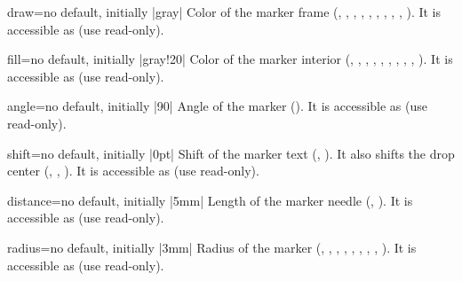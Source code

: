 \begin{docMrcKey}[marker]{draw}{=}{no default, initially |gray|}
  Color of the marker frame
  (, , , ,
    , , , ,
    , ).
  It is accessible as  (use read-only).
\end{docMrcKey}

\begin{docMrcKey}[marker]{fill}{=}{no default, initially |gray!20|}
  Color of the marker interior
  (, , , ,
    , , , ,
    , ).
  It is accessible as  (use read-only).
\end{docMrcKey}

\begin{docMrcKey}[marker]{angle}{=}{no default, initially |90|}
  Angle of the marker ().
  It is accessible as  (use read-only).
\end{docMrcKey}

\begin{docMrcKey}[marker]{shift}{=}{no default, initially |0pt|}
  Shift of the marker text
  (, ).
  It also shifts the drop center
  (, , ).
  It is accessible as  (use read-only).
\end{docMrcKey}

\begin{docMrcKey}[marker][doc new=2020-08-06]{distance}{=}{no default, initially |5mm|}
  Length of the marker needle (, ).
  It is accessible as  (use read-only).
\end{docMrcKey}

\clearpage

\begin{docMrcKey}[marker]{radius}{=}{no default, initially |3mm|}
  Radius of the marker
  (, , ,
    , , , ,
    , ).
  It is accessible as  (use read-only).
\end{docMrcKey}

